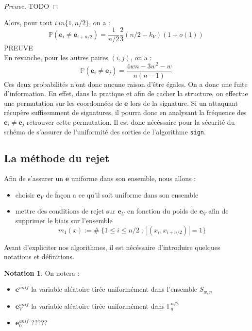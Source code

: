 \documentclass[12pt]{article}
\theoremstyle{definition}
\newtheorem{nota}[thm]{Notation}
\newcommand{\F}{\mathbb{F}}
\begin{document}
\begin{proof}[Preuve]
TODO
\end{proof}

Alors, pour tout $i \ in \{1,n/2\}$, on a :
$$ \mathbb{P}(\mathbf{e}_i \neq \mathbf{e}_{i+n/2}) = \frac{1}{n/2}\frac{2}{3}(n/2-k_V)(1+o(1))$$
PREUVE \\
En revanche, pour les autres paires $(i,j)$, on a :
$$ \mathbb{P}(\mathbf{e}_i \neq \mathbf{e}_{j}) = \frac{4wn - 3w^2-w}{n(n-1)}$$
Ces deux probabilités n'ont donc aucune raison d'être égales. On a donc une fuite d'information. En effet, dans la pratique et afin de cacher la structure, on effectue une permutation sur les coordonnées de $\mathbf{e}$ lors de la signature. Si un attaquant récupère suffisemment de signatures, il pourra donc en analysant la fréquence des $\mathbf{e}_i \neq \mathbf{e}_j$ retrouver cette permutation. Il est donc nécéssaire pour la sécurité du schéma de s'assurer de l'uniformité des sorties de l'algorithme \verb|sign|.

\subsection{La méthode du rejet}
Afin de s'assurer un $\mathbf{e}$ uniforme dans son ensemble, nous allons :
\begin{itemize}
\item choisir $\mathbf{e}_V$ de façon a ce qu'il soit uniforme dans son ensemble 
\item mettre des conditions de rejet sur $\mathbf{e}_U$ en fonction du poids de $\mathbf{e}_V$ afin de supprimer le biais sur l'ensemble 
$$ m_1(x) := \# \; \{1  \leq i \leq n/2 \;;\; |(x_i, x_{i+n/2})| = 1\}$$
\end{itemize}
Avant d'expliciter nos algorithmes, il est nécéssaire d'introduire quelques notations et définitions. \\

\begin{nota} On notera :
\begin{itemize}
\item $\mathbf{e}^{unif}$ la variable aléatoire tirée uniformément dans l'ensemble $S_{w,n}$
\item $\mathbf{e}_V^{unif}$ la variable aléatoire tirée uniformément dans $\F_q^{n/2}$
\item $\mathbf{e}_U^{unif}$ ?????
\end{itemize}
\end{nota}
\end{document}
